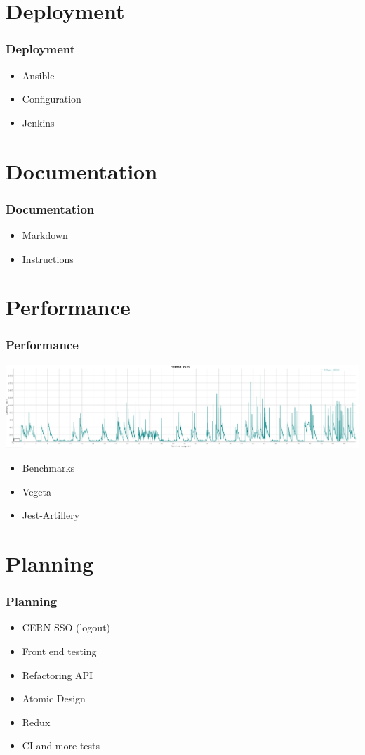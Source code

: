 \documentclass[12pt]{beamer}
\begin{document}
	\section{Deployment}
	\begin{frame}
		\frametitle{Deployment}
		\begin{itemize}
			\item Ansible
			\item Configuration
			\item Jenkins
		\end{itemize}
	\end{frame}

	\section{Documentation}
	\begin{frame}
		\frametitle{Documentation}
		\begin{itemize}
			\item Markdown
			\item Instructions
		\end{itemize}
	\end{frame}

	\section{Performance}
	\begin{frame}
		\frametitle{Performance}
		\includegraphics[scale=0.15]{assets/vegeta-plot.png}
		\begin{itemize}
			\item Benchmarks
			\item Vegeta
			\item Jest-Artillery
		\end{itemize}
	\end{frame}

	\section{Planning}
	\begin{frame}
		\frametitle{Planning}
		\begin{itemize}
			\item CERN SSO (logout)
			\item Front end testing
			\item Refactoring API
			\item Atomic Design
			\item Redux
			\item CI and more tests
		\end{itemize}
	\end{frame}
\end{document}
